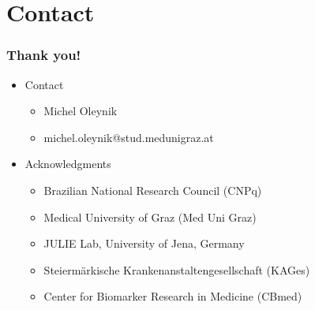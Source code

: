\section*{Contact}

\begin{frame}
	\frametitle{Thank you!}
	\begin{itemize} \myspacing
		\item Contact
		\begin{itemize}
			\item Michel Oleynik
			\item michel.oleynik@stud.medunigraz.at
		\end{itemize}
		\item Acknowledgments
		\begin{itemize}
			\item Brazilian National Research Council (CNPq)
			\item Medical University of Graz (Med Uni Graz)
			\item JULIE Lab, University of Jena, Germany
			\item Steiermärkische Krankenanstaltengesellschaft (KAGes)
			\item Center for Biomarker Research in Medicine (CBmed)
		\end{itemize}
	\end{itemize}
\end{frame}
